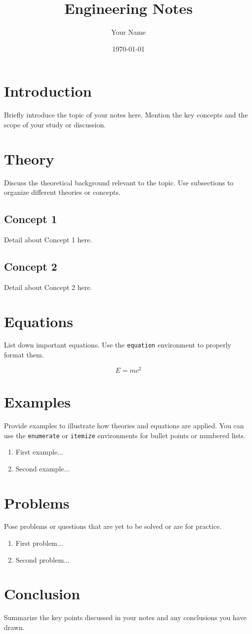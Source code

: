 \documentclass[11pt]{article}
\title{Engineering Notes}
\author{Your Name}
\date{\today}
\begin{document}
\maketitle
\tableofcontents
\newpage

\section{Introduction}
Briefly introduce the topic of your notes here. Mention the key concepts and the scope of your study or discussion.

\section{Theory}
Discuss the theoretical background relevant to the topic. Use subsections to organize different theories or concepts.

\subsection{Concept 1}
Detail about Concept 1 here.

\subsection{Concept 2}
Detail about Concept 2 here.

\section{Equations}
List down important equations. Use the \texttt{equation} environment to properly format them.

\begin{equation}
E = mc^2
\end{equation}

\section{Examples}
Provide examples to illustrate how theories and equations are applied. You can use the \texttt{enumerate} or \texttt{itemize} environments for bullet points or numbered lists.

\begin{enumerate}
    \item First example...
    \item Second example...
\end{enumerate}

\section{Problems}
Pose problems or questions that are yet to be solved or are for practice.

\begin{enumerate}
    \item First problem...
    \item Second problem...
\end{enumerate}

\section{Conclusion}
Summarize the key points discussed in your notes and any conclusions you have drawn.

\end{document}
